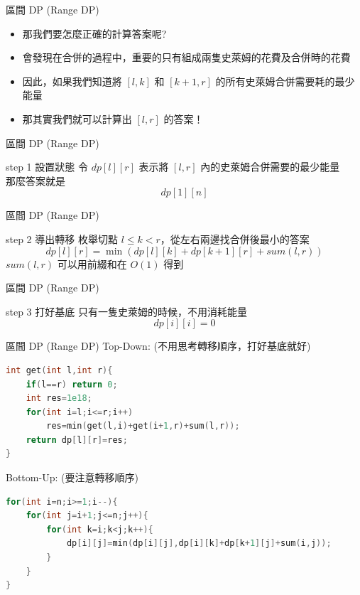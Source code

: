 \documentclass[aspectratio=169]{beamer}
\begin{document}
    \begin{frame}{區間 DP (Range DP)}
        \begin{itemize}
            \item 那我們要怎麼正確的計算答案呢?
            \item 會發現在合併的過程中，重要的只有組成兩隻史萊姆的花費及合併時的花費
            \item 因此，如果我們知道將 $[l,k]$ 和 $[k+1,r]$ 的所有史萊姆合併需要耗的最少能量
            \item 那其實我們就可以計算出 $[l,r]$ 的答案！
        \end{itemize}
    \end{frame}
    
    \begin{frame}{區間 DP (Range DP)}
        \begin{alertblock}{step 1 設置狀態}
            令 $dp[l][r]$ 表示將 $[l,r]$ 內的史萊姆合併需要的最少能量 \\
            \vspace{2.5mm}
            那麼答案就是 $$dp[1][n]$$
        \end{alertblock}
    \end{frame}
    
    \begin{frame}{區間 DP (Range DP)}
        \begin{block}{step 2 導出轉移}
            枚舉切點 $l \le k < r$，從左右兩邊找合併後最小的答案
            $$dp[l][r] = \min (dp[l][k] + dp[k+1][r] + sum(l,r))$$
            $sum(l,r)$ 可以用前綴和在 $O(1)$ 得到
        \end{block}
    \end{frame}
    
    \begin{frame}{區間 DP (Range DP)}
        \begin{block}{step 3 打好基底}
            只有一隻史萊姆的時候，不用消耗能量
            $$dp[i][i] = 0$$
        \end{block}
    \end{frame}

    \begin{frame}[fragile]{區間 DP (Range DP)}
        Top-Down: (不用思考轉移順序，打好基底就好)
        \begin{lstlisting}[language=C++,basicstyle=\ttfamily \small]
int get(int l,int r){
    if(l==r) return 0;
    int res=1e18;
    for(int i=l;i<=r;i++)
        res=min(get(l,i)+get(i+1,r)+sum(l,r));
    return dp[l][r]=res;
}
        \end{lstlisting}
        Bottom-Up: (要注意轉移順序)
        \begin{lstlisting}[language=C++,basicstyle=\ttfamily \small]
for(int i=n;i>=1;i--){
    for(int j=i+1;j<=n;j++){
        for(int k=i;k<j;k++){
            dp[i][j]=min(dp[i][j],dp[i][k]+dp[k+1][j]+sum(i,j));
        }
    }
}
        \end{lstlisting}
    \end{frame} 
    
\end{document}
